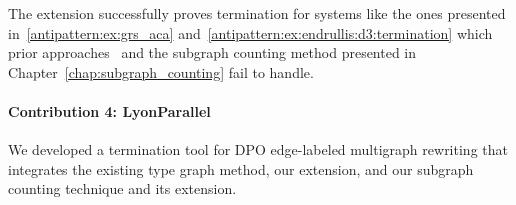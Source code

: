 The extension successfully proves termination for systems like the ones presented in~\autoref{antipattern:ex:grs_aca} and~\autoref{antipattern:ex:endrullis:d3:termination} which prior approaches~\cite{zantema2014termination,bruggink2014termination,bruggink2015proving,endrullis2024generalized_arxiv_v2,overbeek2024termination_lmcs} and the subgraph counting method presented in Chapter~\ref{chap:subgraph_counting} fail to handle. 

\paragraph{Contribution 4: LyonParallel}
We developed a termination tool for DPO edge-labeled multigraph rewriting that integrates the existing type graph method, our extension, and our subgraph counting technique and its extension.